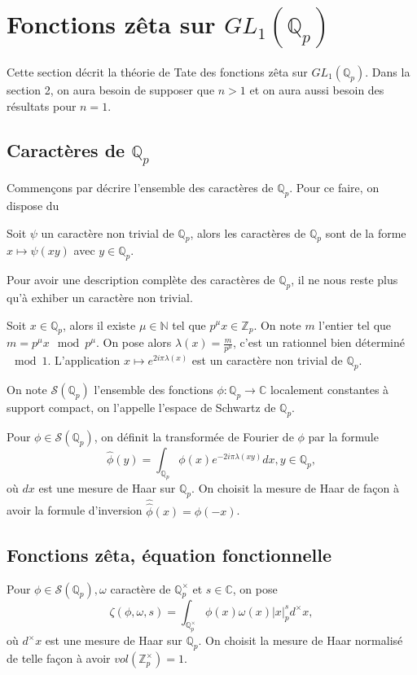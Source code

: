 \section{Fonctions zêta sur $GL_1(\mathbb{Q}_p)$}

Cette section décrit la théorie de Tate \cite{tate} des fonctions zêta sur $GL_1(\mathbb{Q}_p)$. Dans la section 2, on aura besoin de supposer que $n > 1$ et on aura aussi besoin des résultats pour $n=1$.

\subsection{Caractères de $\mathbb{Q}_p$}

Commençons par décrire l'ensemble des caractères de $\mathbb{Q}_p$. Pour ce faire, on dispose du

\begin{lemme}
Soit $\psi$ un caractère non trivial de $\mathbb{Q}_p$, alors les caractères de $\mathbb{Q}_p$ sont de la forme $x \mapsto \psi(xy)$ avec $y \in \mathbb{Q}_p$.
\end{lemme}

Pour avoir une description complète des caractères de $\mathbb{Q}_p$, il ne nous reste plus qu'à exhiber un caractère non trivial.

Soit $x \in \mathbb{Q}_p$, alors il existe $\mu \in \mathbb{N}$ tel que $p^\mu x \in \mathbb{Z}_p$. On note $m$ l'entier tel que $m = p^\mu x \mod p^\mu$. On pose alors $\lambda(x) = \frac{m}{p^\mu}$, c'est un rationnel bien déterminé $\mod 1$. L'application $x \mapsto e^{2i\pi \lambda(x)}$ est un caractère non trivial de $\mathbb{Q}_p$.

On note $\mathcal{S}(\mathbb{Q}_p)$ l'ensemble des fonctions $\phi : \mathbb{Q}_p \rightarrow \mathbb{C}$ localement constantes à support compact, on l'appelle l'espace de Schwartz de $\mathbb{Q}_p$.

Pour $\phi \in \mathcal{S}(\mathbb{Q}_p)$, on définit la transformée de Fourier de $\phi$ par la formule
\begin{equation}
\hat{\phi}(y) = \int_{\mathbb{Q}_p} \phi(x) e^{-2i\pi \lambda(xy)}dx, y \in \mathbb{Q}_p,
\end{equation}
où $dx$ est une mesure de Haar sur $\mathbb{Q}_p$. On choisit la mesure de Haar de façon à avoir la formule d'inversion $\hat{\hat{\phi}}(x)=\phi(-x)$.

\subsection{Fonctions zêta, équation fonctionnelle}
\begin{definition}
Pour $\phi \in \mathcal{S}(\mathbb{Q}_p), \omega$ caractère de $\mathbb{Q}_p^\times$ et $s \in \mathbb{C}$, on pose
\begin{equation}
\zeta(\phi,\omega,s) = \int_{\mathbb{Q}_p^\times} \phi(x) \omega(x) |x|_p^s d^\times x,
\end{equation}
où $d^\times x$ est une mesure de Haar sur $\mathbb{Q}_p$. On choisit la mesure de Haar normalisé de telle façon à avoir $vol(\mathbb{Z}_p^\times)=1$.
\end{definition}


